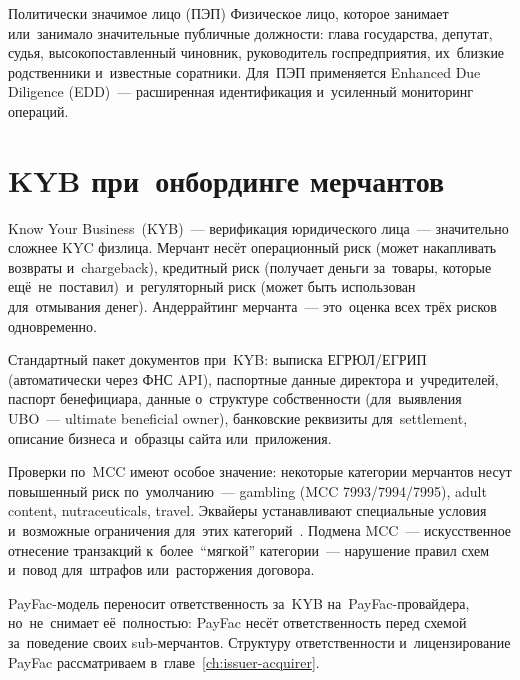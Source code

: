 \begin{termdef}{Политически значимое лицо (ПЭП)}
  Физическое лицо, которое занимает или~занимало значительные публичные
  должности: глава государства, депутат, судья, высокопоставленный чиновник,
  руководитель госпредприятия, их~близкие родственники и~известные
  соратники. Для~ПЭП применяется Enhanced Due Diligence (EDD)~---
  расширенная идентификация и~усиленный мониторинг операций.
\end{termdef}


\section{KYB при~онбординге мерчантов}
\label{sec:compliance-kyb}

Know Your Business~(KYB)~--- верификация юридического лица~---
значительно сложнее KYC физлица. Мерчант несёт операционный риск (может
накапливать возвраты и~chargeback), кредитный риск (получает деньги
за~товары, которые ещё~не~поставил)~и~регуляторный риск (может быть
использован для~отмывания денег). Андеррайтинг мерчанта~--- это~оценка
всех трёх рисков одновременно.

Стандартный пакет документов при~KYB: выписка ЕГРЮЛ/ЕГРИП (автоматически
через ФНС API), паспортные данные директора и~учредителей, паспорт
бенефициара, данные о~структуре собственности (для~выявления UBO~---
ultimate beneficial owner), банковские реквизиты для~settlement, описание
бизнеса и~образцы сайта или~приложения.

Проверки по~MCC имеют особое значение: некоторые категории мерчантов
несут повышенный риск по~умолчанию~--- gambling (MCC 7993/7994/7995),
adult content, nutraceuticals, travel. Эквайеры устанавливают специальные
условия и~возможные ограничения для~этих категорий~.
Подмена MCC~--- искусственное отнесение транзакций к~более~\enquote{мягкой}
категории~--- нарушение правил схем и~повод для~штрафов или~расторжения
договора.

PayFac-модель переносит ответственность за~KYB на~PayFac-провайдера,
но~не~снимает её~полностью: PayFac несёт ответственность перед схемой
за~поведение своих sub-мерчантов. Структуру ответственности и~лицензирование
PayFac рассматриваем в~главе~\ref{ch:issuer-acquirer}.



